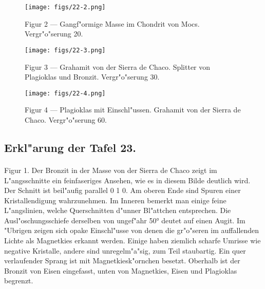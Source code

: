 \documentclass[a4paper, 11pt, oneside, polutonikogreek, german]{article}
\begin{document}
\vspace*{\fill}
\begin{figure}[H]
\centering
\texttt{[image: figs/22-2.png]}
\caption{\small Figur 2 --- Gangf"ormige Masse im Chondrit von Mocs. Vergr"o"serung 20.}
\end{figure}
\vspace*{\fill}
\clearpage

\vspace*{\fill}
\begin{figure}[H]
\centering
\texttt{[image: figs/22-3.png]}
\caption{\small Figur 3 --- Grahamit von der Sierra de Chaco. Splitter von Plagioklas und Bronzit. Vergr"o"serung 30.}
\end{figure}
\vspace*{\fill}
\clearpage

\vspace*{\fill}
\begin{figure}[H]
\centering
\texttt{[image: figs/22-4.png]}
\caption{\small Figur 4 --- Plagioklas mit Einschl"ussen. Grahamit von der Sierra de Chaco. Vergr"o"serung 60.}
\end{figure}
\vspace*{\fill} 
\clearpage

\subsection{Erkl"arung der Tafel 23.}
\paragraph{}
Figur 1. Der Bronzit in der Masse von der Sierra de Chaco zeigt im L"angsschnitte ein feinfaseriges Ansehen, wie es in diesem Bilde deutlich wird. Der Schnitt ist beil"aufig parallel 0 1 0. Am oberen Ende sind Spuren einer Kristallendigung wahrzunehmen. Im Inneren bemerkt man einige feine L"angslinien, welche Querschnitten d"unner Bl"attchen entsprechen. Die Ausl"oschungsschiefe derselben von ungef"ahr 50° deutet auf einen Augit. Im "Ubrigen zeigen sich opake Einschl"usse von denen die gr"o"seren im auffallenden Lichte als Magnetkies erkannt werden. Einige haben ziemlich scharfe Umrisse wie negative Kristalle, andere sind unregelm"a"sig, zum Teil staubartig. Ein quer verlaufender Sprang ist mit Magnetkiesk"ornchen besetzt. Oberhalb ist der Bronzit von Eisen eingefasst, unten von Magnetkies, Eisen und Plagioklas begrenzt.
\end{document}
